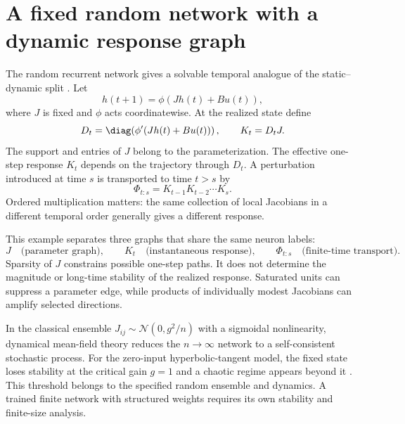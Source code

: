 \section{A fixed random network with a dynamic response graph}

The random recurrent network gives a solvable temporal analogue of the static--dynamic split
\cite{sompolinsky1988}.  Let
\begin{equation}
h(t+1)=\phi\!\left(Jh(t)+Bu(t)\right),
\label{eq:book-rnn-dynamics}
\end{equation}
where $J$ is fixed and $\phi$ acts coordinatewise.  At the realized state define
\begin{equation}
D_t=\diag\!\left(\phi'(Jh(t)+Bu(t))\right),
\qquad K_t=D_tJ.
\label{eq:book-rnn-local-jacobian}
\end{equation}
The support and entries of $J$ belong to the parameterization.  The effective one-step response
$K_t$ depends on the trajectory through $D_t$.  A perturbation introduced at time $s$ is transported
to time $t>s$ by
\begin{equation}
\Phi_{t:s}=K_{t-1}K_{t-2}\cdots K_s.
\label{eq:book-rnn-propagator}
\end{equation}
Ordered multiplication matters: the same collection of local Jacobians in a different temporal
order generally gives a different response.

This example separates three graphs that share the same neuron labels:
\begin{equation}
J\quad\text{(parameter graph)},\qquad
K_t\quad\text{(instantaneous response)},\qquad
\Phi_{t:s}\quad\text{(finite-time transport)}.
\label{eq:book-rnn-three-graphs}
\end{equation}
Sparsity of $J$ constrains possible one-step paths.  It does not determine the magnitude or
long-time stability of the realized response.  Saturated units can suppress a parameter edge,
while products of individually modest Jacobians can amplify selected directions.

In the classical ensemble $J_{ij}\sim\mathcal N(0,g^2/n)$ with a sigmoidal nonlinearity,
dynamical mean-field theory reduces the $n\to\infty$ network to a self-consistent stochastic
process.  For the zero-input hyperbolic-tangent model, the fixed state loses stability at the
critical gain $g=1$ and a chaotic regime appears beyond it \cite{sompolinsky1988}.  This threshold
belongs to the specified random ensemble and dynamics.  A trained finite network with structured
weights requires its own stability and finite-size analysis.


